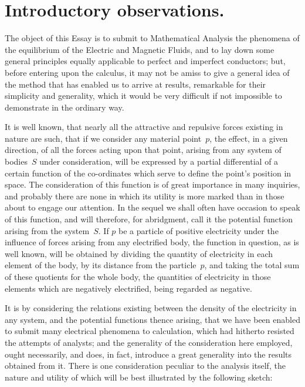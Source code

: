 \documentclass[12pt,notitlepage]{amsart}
\begin{document}
\section{Introductory observations.}
The object of this Essay is to submit to Mathematical Analysis the
phenomena of the equilibrium of the Electric and Magnetic Fluids, and to lay
down some general principles equally applicable to perfect and imperfect 
conductors; but, before entering upon the calculus, it may not be amiss to give
a general idea of the method that has enabled us to arrive at results, 
remarkable for their simplicity and generality,
which it would be very difficult if
not impossible to demonstrate in the ordinary way.

It is well known, that nearly all the attractive and repulsive forces
existing in nature are such, that if we consider any material point~$p$, the
effect, in a given direction, of all the forces acting upon that point, arising
from any system of bodies~$S$ under consideration, will be expressed by a
partial differential of a certain function of the co-ordinates which serve to
define the point's position in space. The consideration of this function is of
great importance in many inquiries, and probably there are none in which its
utility is more marked than in those about to engage our attention. In the
sequel we shall often have occasion to speak of this function, and will 
therefore, for abridgment, call it the potential
function arising from the system~$S$.
If $p$ be a particle of positive electricity
under the influence of forces arising
from any electrified body, the function in question, as is well known, will be
obtained by dividing the quantity of electricity in each element of the body,
by its distance from the particle~$p$,
and taking the total sum of these quotients
for the whole body, the quantities of electricity in those elements which are
negatively electrified, being regarded as negative.

It is by considering the relations existing between the density of the
electricity in any system, and the potential functions thence arising, that we
have been enabled to submit many electrical phenomena to calculation, which
had hitherto resisted the attempts of analysts; and the generality of the 
consideration here employed, ought necessarily, and does, in fact, introduce a
great generality into the results obtained from it. There is one consideration
peculiar to the analysis itself, the nature and utility of which will be best
illustrated by the following sketch:
\end{document}
